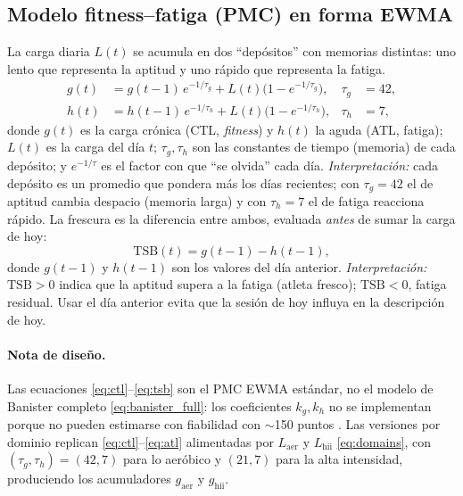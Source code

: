 \documentclass[11pt,a4paper]{article}
\begin{document}
\subsection{Modelo fitness--fatiga (PMC) en forma EWMA}
\label{sec:pmc}
La carga diaria $L(t)$ se acumula en dos ``depósitos'' con memorias distintas: uno lento que representa la aptitud y uno rápido que representa la fatiga.
\begin{align}
g(t) &= g(t-1)\,e^{-1/\tau_g} + L(t)\big(1 - e^{-1/\tau_g}\big), & \tau_g &= 42, \label{eq:ctl}\\
h(t) &= h(t-1)\,e^{-1/\tau_h} + L(t)\big(1 - e^{-1/\tau_h}\big), & \tau_h &= 7, \label{eq:atl}
\end{align}
donde $g(t)$ es la carga crónica (CTL, \emph{fitness}) y $h(t)$ la aguda (ATL, fatiga); $L(t)$ es la carga del día $t$; $\tau_g,\tau_h$ son las constantes de tiempo (memoria) de cada depósito; y $e^{-1/\tau}$ es el factor con que ``se olvida'' cada día. \textit{Interpretación:} cada depósito es un promedio que pondera más los días recientes; con $\tau_g=42$ el de aptitud cambia despacio (memoria larga) y con $\tau_h=7$ el de fatiga reacciona rápido. La frescura es la diferencia entre ambos, evaluada \emph{antes} de sumar la carga de hoy:
\begin{equation}
\mathrm{TSB}(t) = g(t-1) - h(t-1),
\label{eq:tsb}
\end{equation}
donde $g(t-1)$ y $h(t-1)$ son los valores del día anterior. \textit{Interpretación:} $\mathrm{TSB}>0$ indica que la aptitud supera a la fatiga (atleta fresco); $\mathrm{TSB}<0$, fatiga residual. Usar el día anterior evita que la sesión de hoy influya en la descripción de hoy.

\paragraph{Nota de diseño.} Las ecuaciones \eqref{eq:ctl}--\eqref{eq:tsb} son el PMC EWMA estándar, no el modelo de Banister completo \eqref{eq:banister_full}: los coeficientes $k_g,k_h$ no se implementan porque no pueden estimarse con fiabilidad con $\sim$150 puntos \citep{hellard2006}. Las versiones por dominio replican \eqref{eq:ctl}--\eqref{eq:atl} alimentadas por $L_{\mathrm{aer}}$ y $L_{\mathrm{hii}}$ \eqref{eq:domains}, con $(\tau_g,\tau_h)=(42,7)$ para lo aeróbico y $(21,7)$ para la alta intensidad, produciendo los acumuladores $g_{\mathrm{aer}}$ y $g_{\mathrm{hii}}$.
\end{document}

